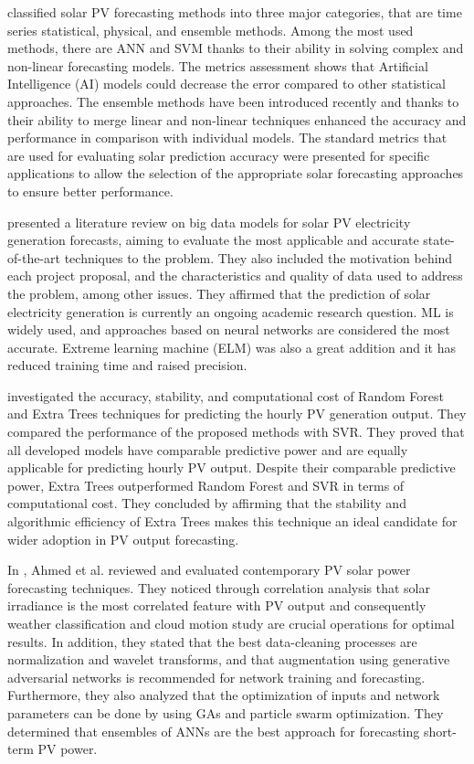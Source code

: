 \cite{SOBRI2018459} classified solar PV forecasting methods into three major categories, that are time series statistical, physical, and ensemble methods.
Among the most used methods, there are ANN and SVM thanks to their ability in solving complex and non-linear forecasting models.
The metrics assessment shows that Artificial Intelligence (AI) models could decrease the error compared to other statistical approaches.
The ensemble methods have been introduced recently and thanks to their ability to merge linear and non-linear techniques enhanced the accuracy and performance in comparison with individual models.
The standard metrics that are used for evaluating solar prediction accuracy were presented for specific applications to allow the selection of the appropriate solar forecasting approaches to ensure better performance.

\cite{DEFREITASVISCONDI201954} presented a literature review on big data models for solar PV electricity generation forecasts, aiming to evaluate the most applicable and accurate state-of-the-art techniques to the problem.
They also included the motivation behind each project proposal, and the characteristics and quality of data used to address the problem, among other issues.
They affirmed that the prediction of solar electricity generation is currently an ongoing academic research question.
ML is widely used, and approaches based on neural networks are considered the most accurate.
Extreme learning machine (ELM) was also a great addition and it has reduced training time and raised precision.

\cite{AHMAD2018465} investigated the accuracy, stability, and computational cost of Random Forest and Extra Trees techniques for predicting the hourly PV generation output.
They compared the performance of the proposed methods with SVR.
They proved that all developed models have comparable predictive power and are equally applicable for predicting hourly PV output.
Despite their comparable predictive power, Extra Trees outperformed Random Forest and SVR in terms of computational cost.
They concluded by affirming that the stability and algorithmic efficiency of Extra Trees makes this technique an ideal candidate for wider adoption in PV output forecasting.

In \cite{AHMED2020109792}, Ahmed et al. reviewed and evaluated contemporary PV solar power forecasting techniques.
They noticed through correlation analysis that solar irradiance is the most correlated feature with PV output and consequently weather classification and cloud motion study are crucial operations for optimal results.
In addition, they stated that the best data-cleaning processes are normalization and wavelet transforms, and that augmentation using generative adversarial networks is recommended for network training and forecasting.
Furthermore, they also analyzed that the optimization of inputs and network parameters can be done by using GAs and particle swarm optimization.
They determined that ensembles of ANNs are the best approach for forecasting short-term PV power.

